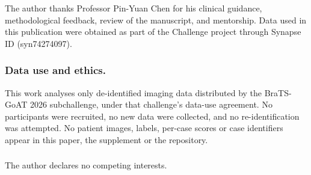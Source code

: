 \documentclass[runningheads]{llncs}
\begin{document}
\begin{credits}
\subsubsection{\ackname}
The author thanks Professor Pin-Yuan Chen for his clinical guidance, methodological feedback,
review of the manuscript, and mentorship.
Data used in this publication were obtained as part of the Challenge project through Synapse ID
(syn74274097).

\subsubsection{Data use and ethics.} This work analyses only de-identified
imaging data distributed by the BraTS-GoAT 2026 subchallenge, under that challenge's data-use
agreement. No participants were recruited, no new data were collected, and no re-identification was
attempted. No patient images, labels, per-case scores or case identifiers appear in this paper, the
supplement or the repository.

\subsubsection{\discintname} The author declares no competing interests.
\end{credits}



\end{document}
